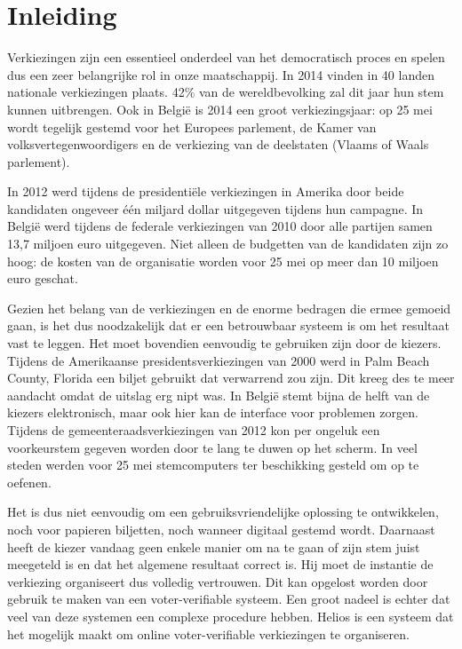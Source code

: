 % 
%

\chapter{Inleiding}
\label{chap:inleiding}

Verkiezingen zijn een essentieel onderdeel van het democratisch proces en spelen dus een zeer belangrijke rol in onze maatschappij. In 2014 vinden in 40 landen nationale verkiezingen plaats. 42\% van de wereldbevolking zal dit jaar hun stem kunnen uitbrengen.\cite{news:economist_2014_ballot_boxes} Ook in Belgi\"e is 2014 een groot verkiezingsjaar: op 25 mei wordt tegelijk gestemd voor het Europees parlement, de Kamer van volksvertegenwoordigers en de verkiezing van de deelstaten (Vlaams of Waals parlement).

\npar In 2012 werd tijdens de presidenti\"ele verkiezingen in Amerika door beide kandidaten ongeveer \'e\'en miljard dollar uitgegeven tijdens hun campagne.\cite{news:nytimes_2012_money_race} In Belgi\"e werd tijdens de federale verkiezingen van 2010 door alle partijen samen 13,7 miljoen euro uitgegeven. Niet alleen de budgetten van de kandidaten zijn zo hoog: de kosten van de organisatie worden voor 25 mei op meer dan 10 miljoen euro geschat.\cite{news:tijd_moeder_aller_verkiezingen_kostprijs}

\npar Gezien het belang van de verkiezingen en de enorme bedragen die ermee gemoeid gaan, is het dus noodzakelijk dat er een betrouwbaar systeem is om het resultaat vast te leggen. Het moet bovendien eenvoudig te gebruiken zijn door de kiezers. Tijdens de Amerikaanse presidentsverkiezingen van 2000 werd in Palm Beach County, Florida een biljet gebruikt dat verwarrend zou zijn. Dit kreeg des te meer aandacht omdat de uitslag erg nipt was.\cite{wiki:united_states_presidential_election_in_florida_2000} In Belgi\"e stemt bijna de helft van de kiezers elektronisch, maar ook hier kan de interface voor problemen zorgen. Tijdens de gemeenteraadsverkiezingen van 2012 kon per ongeluk een voorkeurstem gegeven worden door te lang te duwen op het scherm.\cite{news:maddens_zijn_de_stemcomputers_wel_te_vertrouwen} In veel steden werden voor 25 mei stemcomputers ter beschikking gesteld om op te oefenen.\cite{news:de_redactie_ga_eens_oefenen_op_een_stemcomputer}

\npar Het is dus niet eenvoudig om een gebruiksvriendelijke oplossing te ontwikkelen, noch voor papieren biljetten, noch wanneer digitaal gestemd wordt. Daarnaast heeft de kiezer vandaag geen enkele manier om na te gaan of zijn stem juist meegeteld is en dat het algemene resultaat correct is. Hij moet de instantie de verkiezing organiseert dus volledig vertrouwen. Dit kan opgelost worden door gebruik te maken van een voter-verifiable systeem. Een groot nadeel is echter dat veel van deze systemen een complexe procedure hebben. Helios is een systeem dat het mogelijk maakt om online voter-verifiable verkiezingen te organiseren.

